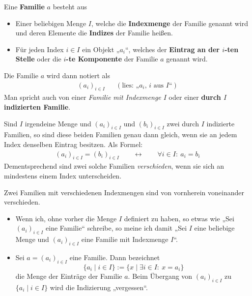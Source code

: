 \begin{defin}[Familien] \label{def:familie}   
    Eine \textbf{Familie} $a$ besteht aus
    \begin{itemize}
        \item Einer beliebigen Menge $I$, welche die \textbf{Indexmenge} der Familie genannt wird und deren Elemente die \textbf{Indizes} der Familie heißen.
        \item Für jeden Index $i\in I$ ein Objekt „$a_i$“, welches der \textbf{Eintrag an der $i$-ten Stelle} oder die \textbf{$i$-te Komponente} der Familie $a$ genannt wird.
    \end{itemize}
    Die Familie $a$ wird dann notiert als
    \begin{align*}
        (a_i)_{i\in I} && (\text{lies: „$a_i$, $i$ aus $I$“})
    \end{align*}
    Man spricht auch von einer \emph{Familie mit Indexmenge $I$} oder einer \textbf{durch $I$ indizierten Familie}.
\end{defin}


\begin{axiom} \label{familiengleich}
    Sind $I$ irgendeine Menge und $(a_i)_{i\in I}$ und $(b_i)_{i\in I}$ zwei durch $I$ indizierte Familien, so sind diese beiden Familien genau dann gleich, wenn sie an jedem Index denselben Eintrag besitzen. Als Formel:
    \begin{align*}
        (a_i)_{i\in I}=(b_i)_{i\in I} \qquad\leftrightarrow\qquad \forall i\in I:\ a_i=b_i
    \end{align*}
    Dementsprechend sind zwei solche Familien \emph{verschieden}, wenn sie sich an mindestens einem Index unterscheiden.
    
    Zwei Familien mit verschiedenen Indexmengen sind von vornherein voneinander verschieden.
\end{axiom}


\begin{nota} \label{mengeeinerfamilie} \quad
    \begin{itemize}
        \item Wenn ich, ohne vorher die Menge $I$ definiert zu haben, so etwas wie „Sei $(a_i)_{i\in I}$ eine Familie“ schreibe, so meine ich damit „Sei $I$ eine beliebige Menge und $(a_i)_{i\in I}$ eine Familie mit Indexmenge $I$“.
        \item Sei $a=(a_i)_{i\in I}$ eine Familie. Dann bezeichnet
            \[ \{a_i \mid i\in I\} := \{x\mid \exists i\in I:\ x=a_i \} \]
        die Menge der Einträge der Familie $a$. Beim Übergang von $(a_i)_{i\in I}$ zu $\{a_i\mid i\in I\}$ wird die Indizierung „vergessen“.
    \end{itemize}
\end{nota}


